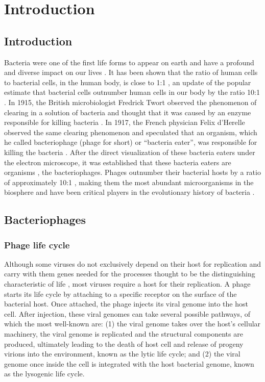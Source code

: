 \chapter{Introduction}
\section{Introduction}

 Bacteria were one of the first life forms to appear on earth and have a profound and diverse impact on our lives \citep{abedon_bacteriophage_2008}.  It has been shown that the ratio of human cells to bacterial cells, in the human body, is close to 1:1 \citep{sender_revised_2016}, an update of the popular estimate that bacterial cells outnumber human cells in our body by the ratio 10:1 \citep{luckey_introduction_1970,savage_microbial_1977}. In 1915, the British microbiologist Fredrick Twort \citep{twort_investigation_1915} observed the phenomenon of clearing in a solution of bacteria and thought that it was caused by an enzyme responsible for killing bacteria \citep{weitz_quantitative_2017}. In 1917, the French physician Felix d’Herelle observed the same clearing phenomenon and speculated that an organism, which he called bacteriophage (phage for short) or “bacteria eater”, was responsible for killing the bacteria \citep{dHerelle_1917}. After the direct visualization of these bacteria eaters under the electron microscope, it was established that these bacteria eaters are organisms \citep {borries_bakterien_1938}, the bacteriophages.  Phages outnumber their bacterial hosts by a ratio of approximately 10:1 \citep{bergh_high_1989}, making them  the most abundant microorganisms in the biosphere \citep{rohwer_global_2003, clokie_phages_2011} and have been critical players in the evolutionary history of bacteria \citep{stern_phage-host_2011}. 

\section{Bacteriophages}
\subsection{Phage life cycle}
Although some viruses do not exclusively depend on their host for replication and carry with them genes needed for the processes thought to be the distinguishing characteristic of life \citep{raoult_1.2-megabase_2004}, most viruses require a host for their replication. A phage starts its life cycle by  attaching to a specific receptor on the surface of the bacterial host. Once attached, the phage injects its viral genome into the host cell. After injection, these viral genomes can take several possible pathways, of which the most well-known are:
(1) the viral genome takes over the host's cellular machinery, the viral genome is replicated and the structural components are produced, ultimately leading to the death of host cell and release of progeny virions into the environment, known as the lytic life cycle; and (2) the viral genome once inside the cell is integrated with the host bacterial genome, known as the lysogenic life cycle. 

